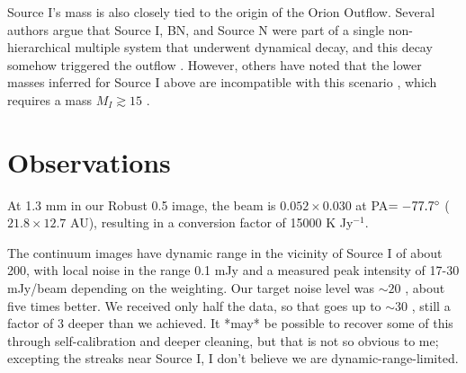 \documentclass[twocolumn]{aastex61}
\begin{document}
Source I's mass is also closely tied to the origin of the Orion Outflow.
Several authors argue that Source I, BN, and Source N \citep[or, alternatively,
source X][]{Luhman2017a} were part of a single non-hierarchical multiple system
that underwent dynamical decay, and this decay somehow triggered the outflow
\citep{Bally2005a,Rodriguez2005a,Goddi2010a,Bally2011a,Bally2015a,Bally2017a}.  However, others have
noted that the lower masses inferred for Source I above are incompatible with
this scenario \citep{Chatterjee2012a,Farias2017a,Plambeck2016a}, which requires
a mass $M_{I} \gtrsim 15$ \msun.

\section{Observations}

At 1.3 mm in our Robust 0.5 image, the beam is $0.052\times0.030$ \arcsec at
PA$=-77.7^{\circ}$ ($21.8\times12.7$ AU), resulting in a 
conversion factor of 15000 K Jy$^{-1}$.


The continuum images have dynamic range in the vicinity of Source I of about 200,
with local noise in the range 0.1 mJy \perbeam and a measured peak intensity of 17-30
mJy/beam depending on the weighting.
{\color{red} Our target noise level was $\sim20$ \microJy \perbeam,
about five times better.  We received only half the data, so that goes up to $\sim30$
\microJy \perbeam, still a factor of 3 deeper than we achieved.  It *may* be possible
to recover some of this through self-calibration and deeper cleaning, but that
is not so obvious to me; excepting the streaks near Source I, I don't believe
we are dynamic-range-limited.}
\end{document}
